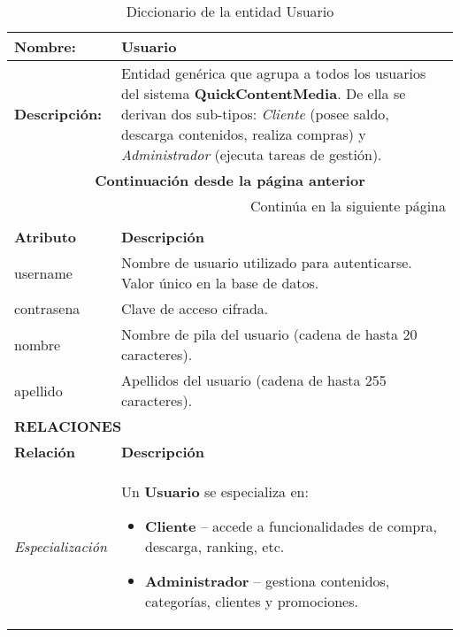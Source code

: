 \renewcommand{\arraystretch}{1.3}
\begin{longtable}{|p{3.5cm}|p{10cm}|}
\caption{Diccionario de la entidad Usuario}
\label{tab:diccionarioUsuario} \\ 
\hline
\textbf{Nombre:} & Usuario \\ \hline
\textbf{Descripción:} & 
Entidad genérica que agrupa a todos los usuarios del sistema
\textbf{QuickContentMedia}.  
De ella se derivan dos sub-tipos: \textit{Cliente} (posee saldo,
descarga contenidos, realiza compras) y \textit{Administrador}
(ejecuta tareas de gestión). \\ \hline
\endfirsthead

\multicolumn{2}{c}{\textbf{Continuación desde la página anterior}} \\ 
\endhead

\hline \multicolumn{2}{r}{{Continúa en la siguiente página}} \\ 
\endfoot

\hline
\endlastfoot

\multicolumn{2}{|p{13.5cm}|}{\textbf{ATRIBUTOS}} \\ \hline
\textbf{Atributo} & \textbf{Descripción} \\ \hline
username    & Nombre de usuario utilizado para autenticarse.  
Valor único en la base de datos. \\ \hline
contrasena  & Clave de acceso cifrada. \\ \hline
nombre      & Nombre de pila del usuario (cadena de hasta 20 caracteres). \\ \hline
apellido    & Apellidos del usuario (cadena de hasta 255 caracteres). \\ \hline

\multicolumn{2}{|p{13.5cm}|}{\textbf{RELACIONES}} \\ \hline
\textbf{Relación} & \textbf{Descripción} \\ \hline
\textit{Especialización} &  
Un \textbf{Usuario} se especializa en:  
\begin{itemize}
  \item \textbf{Cliente} – accede a funcionalidades de compra, descarga, ranking, etc.  
  \item \textbf{Administrador} – gestiona contenidos, categorías, clientes y promociones.
\end{itemize} \\ \hline
\end{longtable}
